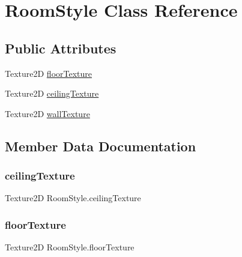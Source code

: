 \hypertarget{class_room_style}{}\section{Room\+Style Class Reference}
\label{class_room_style}
\subsection*{Public Attributes}
\begin{DoxyCompactItemize}
\item 
Texture2D \mbox{\hyperlink{class_room_style_a0115dc57b9a052d8130987bc75d9e068}{floor\+Texture}}
\item 
Texture2D \mbox{\hyperlink{class_room_style_ae81262585be24f8a263f404fb1f2f94b}{ceiling\+Texture}}
\item 
Texture2D \mbox{\hyperlink{class_room_style_afcc5e2058831aa7e50a3bd0cdcbb7b08}{wall\+Texture}}
\end{DoxyCompactItemize}


\subsection{Member Data Documentation}
\mbox{\label{class_room_style_ae81262585be24f8a263f404fb1f2f94b}} 
\subsubsection{\texorpdfstring{ceiling\+Texture}{ceilingTexture}}
{\footnotesize\ttfamily Texture2D Room\+Style.\+ceiling\+Texture}

\mbox{\label{class_room_style_a0115dc57b9a052d8130987bc75d9e068}} 
\subsubsection{\texorpdfstring{floor\+Texture}{floorTexture}}
{\footnotesize\ttfamily Texture2D Room\+Style.\+floor\+Texture}

\mbox{\label{class_room_style_afcc5e2058831aa7e50a3bd0cdcbb7b08}} 
